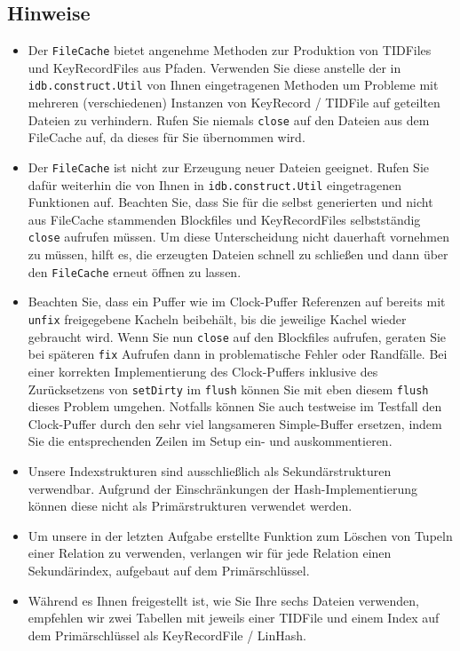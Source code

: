 \subsection{Hinweise}
\begin{itemize}
	\item Der \texttt{FileCache} bietet angenehme Methoden zur Produktion von TIDFiles und KeyRecordFiles aus Pfaden.
		Verwenden Sie diese anstelle der in \texttt{idb.construct.Util} von Ihnen eingetragenen Methoden um Probleme mit mehreren (verschiedenen) Instanzen von KeyRecord / TIDFile auf geteilten Dateien zu verhindern.
		Rufen Sie niemals \texttt{close} auf den Dateien aus dem FileCache auf, da dieses für Sie übernommen wird.
	\item Der \texttt{FileCache} ist nicht zur Erzeugung neuer Dateien geeignet. Rufen Sie dafür weiterhin die von Ihnen in \texttt{idb.construct.Util} eingetragenen Funktionen auf.
		Beachten Sie, dass Sie für die selbst generierten und nicht aus FileCache stammenden Blockfiles und KeyRecordFiles selbstständig \texttt{close} aufrufen müssen.
		Um diese Unterscheidung nicht dauerhaft vornehmen zu müssen, hilft es, die erzeugten Dateien schnell zu schließen und dann über den \texttt{FileCache} erneut öffnen zu lassen.
	\item Beachten Sie, dass ein Puffer wie im Clock-Puffer Referenzen auf bereits mit \texttt{unfix} freigegebene Kacheln beibehält, bis die jeweilige Kachel wieder gebraucht wird.
		Wenn Sie nun \texttt{close} auf den Blockfiles aufrufen, geraten Sie bei späteren \texttt{fix} Aufrufen dann in problematische Fehler oder Randfälle.
		Bei einer korrekten Implementierung des Clock-Puffers inklusive des Zurücksetzens von \texttt{setDirty} im \texttt{flush} können Sie mit eben diesem \texttt{flush} dieses Problem umgehen.
		Notfalls können Sie auch testweise im Testfall den Clock-Puffer durch den sehr viel langsameren Simple-Buffer ersetzen, indem Sie die entsprechenden Zeilen im Setup ein- und auskommentieren.
	\item Unsere Indexstrukturen sind ausschließlich als Sekundärstrukturen verwendbar. Aufgrund der Einschränkungen der Hash-Implementierung können diese nicht als Primärstrukturen verwendet werden.
	\item Um unsere in der letzten Aufgabe erstellte Funktion zum Löschen von Tupeln einer Relation zu verwenden, verlangen wir für jede Relation einen Sekundärindex, aufgebaut auf dem Primärschlüssel.
	\item Während es Ihnen freigestellt ist, wie Sie Ihre sechs Dateien verwenden, empfehlen wir zwei Tabellen mit jeweils einer TIDFile und einem Index auf dem Primärschlüssel als KeyRecordFile / LinHash.

\end{itemize}
